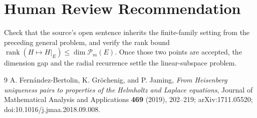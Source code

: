 \documentclass[11pt]{article}
\newcommand{\Poly}{\mathcal P}
\begin{document}
\section*{Human Review Recommendation}

Check that the source's open sentence inherits the finite-family setting
from the preceding general problem, and verify the rank bound
$\operatorname{rank}(H\mapsto H|_E)\leq\dim\Poly_m(E)$.  Once those two
points are accepted, the dimension gap and the radial recurrence settle the
linear-subspace problem.

\begin{thebibliography}{9}
\small
{}
A. Fern\'andez-Bertolin, K. Gr\"ochenig, and P. Jaming,
\emph{From Heisenberg uniqueness pairs to properties of the Helmholtz and
Laplace equations}, Journal of Mathematical Analysis and Applications
\textbf{469} (2019), 202--219; arXiv:1711.05520;
doi:10.1016/j.jmaa.2018.09.008.
\end{thebibliography}
\end{document}
